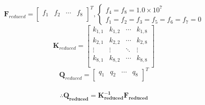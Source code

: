 \documentclass[12pt, a4paper]{article}
\begin{document}
    
    \begin{equation*}
        \mathbf{F}_{reduced}=
        \left[
        \begin{array}{cccc}
            f_1 & f_2 & \cdots & f_8 \\
        \end{array}
        \right]
        ^{T}
    	,
        \left\{
        \begin{array}{l}
        	f_4=f_8=1.0\times 10^7\\
            f_1=f_2=f_3=f_5=f_6=f_7=0
        \end{array}
        \right.
    \end{equation*}
    \begin{equation*}
        \mathbf{K}_{reduced}=
        \left[
        \begin{array}{cccc}
            k_{1,1} & k_{1,2} & \cdots & k_{1,8} \\
            k_{2,1} & k_{2,2} & \cdots & k_{2,8} \\
            \vdots & \vdots & \ddots & \vdots \\
            k_{8,1} & k_{8,2} & \cdots & k_{8,8} \\
        \end{array}
        \right]
    \end{equation*}
    \begin{equation*}
        \mathbf{Q}_{reduced}=
        \left[
        \begin{array}{cccc}
            q_1 & q_2 & \cdots & q_8 \\
        \end{array}
        \right]
        ^{T}
    \end{equation*}
    \\
    \begin{equation}
        \therefore \mathbf{Q_{reduced}=K_{reduced}^{-1}F_{reduced}}
    \end{equation}
        
\end{document}
